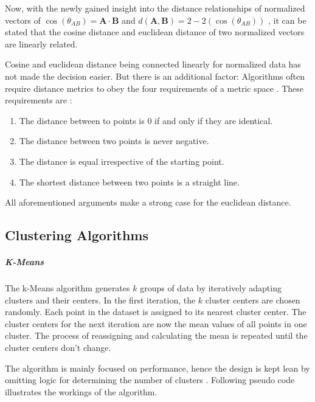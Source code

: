 		Now, with the newly gained insight into the distance relationships of normalized vectors of $\cos(\theta_{AB}) = \mathbf{A} \cdot \mathbf{B}$ and $d(\mathbf{A}, \mathbf{B}) = 2 - 2(\cos(\theta_{AB}))$ , it can be stated that the cosine distance and euclidean distance of two normalized vectors are linearly related.
				
		Cosine and euclidean distance being connected linearly for normalized data has not made the decision easier. But there is an additional factor: 
		Algorithms often require distance metrics to obey the four requirements of a metric space \cite[p.~32]{schubertTriangleInequalityCosine2021}.
		These requirements are \cite[p.~22]{rajaramanNeighborSearchHigh}:
		\begin{enumerate}
			\item The distance between to points is 0 if and only if they are identical.
			\item The distance between two points is never negative.
			\item The distance is equal irrespective of the starting point.
			\item The shortest distance between two points is a straight line.
		\end{enumerate} 
		
		All aforementioned arguments make a strong case for the euclidean distance.
		
\subsection{Clustering Algorithms}
		
		\subparagraph{K-Means}
		The k-Means algorithm generates $k$ groups of data by iteratively adapting clusters and their centers. In the first iteration, the $k$ cluster centers are chosen randomly. Each point in the dataset is assigned to its nearest cluster center. The cluster centers for the next iteration are now the mean values of all points in one cluster. The process of reassigning and calculating the mean is repeated until the cluster centers don't change.
		
		The algorithm is mainly focused on performance, hence the design is kept lean by omitting logic for determining the number of clusters \cite[ch.~6.2]{40algorithms}. Following pseudo code illustrates the workings of the algorithm.
		
	
